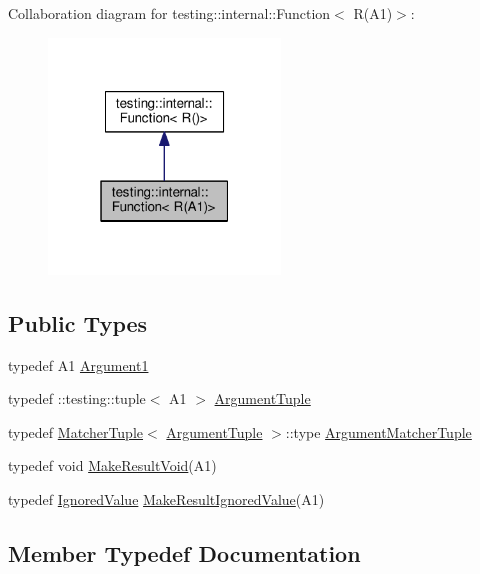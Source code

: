 Collaboration diagram for testing\+:\+:internal\+:\+:Function$<$ R(A1)$>$\+:\nopagebreak
\begin{figure}[H]
\begin{center}
\leavevmode
\includegraphics[width=175pt]{structtesting_1_1internal_1_1Function_3_01R_07A1_08_4__coll__graph}
\end{center}
\end{figure}
\subsection*{Public Types}
\begin{DoxyCompactItemize}
\item 
typedef A1 \hyperlink{structtesting_1_1internal_1_1Function_3_01R_07A1_08_4_aca36c8586218fd015cc4736dc8d4c14f}{Argument1}
\item 
typedef \+::testing\+::tuple$<$ A1 $>$ \hyperlink{structtesting_1_1internal_1_1Function_3_01R_07A1_08_4_afd48881a58d72658e547a170fb0f2087}{Argument\+Tuple}
\item 
typedef \hyperlink{structtesting_1_1internal_1_1MatcherTuple}{Matcher\+Tuple}$<$ \hyperlink{structtesting_1_1internal_1_1Function_3_01R_07_08_4_ad483c3128c470d8cdb55c3ac1c575c11}{Argument\+Tuple} $>$\+::type \hyperlink{structtesting_1_1internal_1_1Function_3_01R_07A1_08_4_a0e35671ae43c3d3310893e1d6d895d06}{Argument\+Matcher\+Tuple}
\item 
typedef void \hyperlink{structtesting_1_1internal_1_1Function_3_01R_07A1_08_4_aab10495172953eb51fc3940c4c1e890a}{Make\+Result\+Void}(A1)
\item 
typedef \hyperlink{classtesting_1_1internal_1_1IgnoredValue}{Ignored\+Value} \hyperlink{structtesting_1_1internal_1_1Function_3_01R_07A1_08_4_a8fa56b9e05cb029ec7c8415ee352f865}{Make\+Result\+Ignored\+Value}(A1)
\end{DoxyCompactItemize}


\subsection{Member Typedef Documentation}
